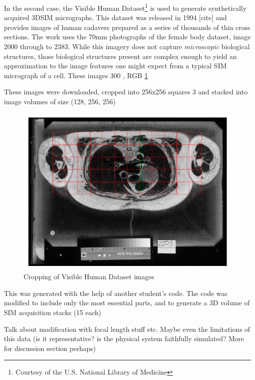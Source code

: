 \documentclass[12pt]{article}
\begin{document}
In the second case, the Visible Human Dataset\footnote{Courtesy of the U.S. National Library of Medicine} is used to generate synthetically acquired 3DSIM micrographs.
This dataset was released in 1994 [cite] and provides images of human cadavers prepared as a series of thousands of thin cross sections.
The work uses the 70mm photographs of the female body dataset, image 2000 through to 2383.
While this imagery does not capture \textit{microscopic} biological structures,
those biological structures present are complex enough to yield an approximation to the image features one might expect from a typical SIM micrograph of a cell.
These images 300 , RGB \ref{fig:vhcrop}



These images were downloaded, cropped into 256x256 squares 3 and stacked into image volumes of size (128, 256, 256)


\begin{figure}[hbt]
    \includegraphics[scale=0.65]{figures/visible_human_volumes_grey.png}
    \caption{Cropping of Visible Human Dataset images}
    \label{fig:vhcrop}
\end{figure}

This was generated with the help of another student's code.
The code was modified to include only the most essential parts, and to generate a 3D volume of SIM acquisition stacks (15 each)

Talk about modification with focal length stuff etc.
Maybe even the limitations of this data (is it representative? is the physical system faithfully simulated? More for discussion section perhaps)
\end{document}
